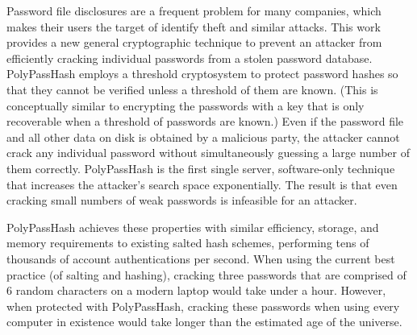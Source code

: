 Password file disclosures are a frequent problem for many companies, which
makes their users the target of identify theft and similar attacks.   
This work provides a new general cryptographic technique to prevent an
attacker from efficiently cracking individual passwords from a stolen
password database.   PolyPassHash employs a threshold cryptosystem to protect
password hashes so that they cannot be verified unless a threshold of them
are known.   (This is conceptually similar to encrypting the passwords with a 
key that is only recoverable when a threshold of passwords are known.)
Even if the password file and all other data on disk is obtained by a 
malicious party, the attacker cannot crack any individual password without 
simultaneously guessing a large number of them correctly.   PolyPassHash
is the first single server, software-only technique that increases
the attacker's search space exponentially.   The result is that even cracking 
small numbers of weak passwords is infeasible for an attacker.   

PolyPassHash achieves these properties with similar efficiency, storage,
and memory requirements to existing salted hash schemes,
performing
tens of thousands of account authentications per second.    
When using the current best practice (of salting and hashing), 
cracking three passwords that are comprised of 6 random characters on
a modern laptop would take under a hour.  However, when protected with
PolyPassHash, cracking these passwords when using every computer in existence
would take longer than the estimated age of the universe.
